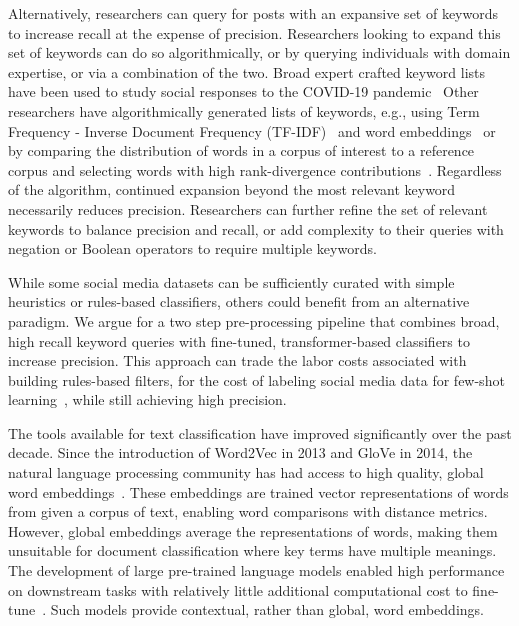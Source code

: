 Alternatively, researchers can query for posts with an expansive set of keywords
to increase recall at the expense of precision. 
Researchers looking to expand this set of keywords can do so algorithmically,
or by querying individuals with domain expertise, or via a combination of the two.
Broad expert crafted keyword lists have been used to study
social responses to the COVID-19 pandemic~\cite{shugars2021pandemics,chen2020tracking,green2020elusive,twitter_2020}%
Other researchers have algorithmically generated lists of keywords, e.g., using Term Frequency - Inverse Document Frequency (TF-IDF)~\cite{aizawa2003information} and word embeddings~\cite{marujo2015automatic} or
by comparing the distribution of words in a corpus of interest to a reference corpus
and selecting words with high rank-divergence contributions~\cite{dodds2020allotaxonometry,alshaabi2021world,minot2022distinguishing,alajajian2015,stupinski2022quantifying}. 
Regardless of the algorithm, continued expansion beyond the most relevant keyword necessarily reduces precision. 
Researchers can further refine the set of relevant keywords to balance precision and recall,
or add complexity to their queries with negation or Boolean operators to require multiple keywords.

While some social media datasets can be sufficiently curated
with simple heuristics
or rules-based classifiers,
others could benefit from an alternative paradigm.
We argue for a two step pre-processing pipeline
that combines broad,
high recall keyword queries
with fine-tuned,
transformer-based classifiers
to increase precision.
This approach can trade the labor costs associated with building rules-based filters, 
for the cost of labeling social media data for few-shot learning~\cite{wang2020generalizing}, while still achieving high precision.

The tools available for text classification have improved significantly over the past decade.
Since the introduction of Word2Vec in 2013 and GloVe in 2014,
the natural language processing community has had access to high quality, global word embeddings~\cite{mikolov2013efficient,pennington2014glove}.
These embeddings are trained vector representations of words from given a corpus of text,
enabling word comparisons with distance metrics.
However, global embeddings average the representations of words,
making them unsuitable for document classification
where key terms have multiple meanings.
The development of large pre-trained language models
enabled high performance on downstream tasks with relatively little additional computational cost to fine-tune~\cite{devlin2018bert,liu2019roberta}.
Such models provide contextual, rather than global, word embeddings. 

